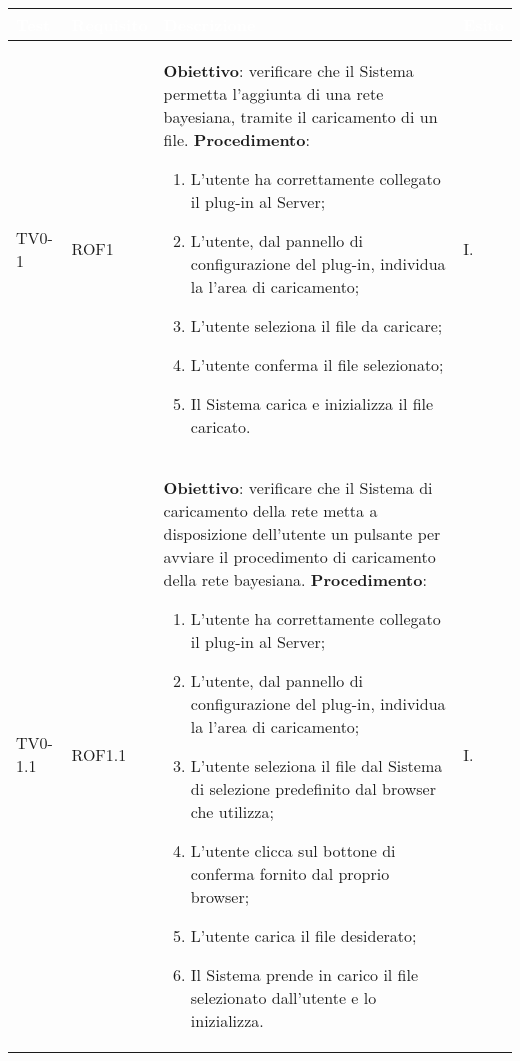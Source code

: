 \begin{longtable}{|C{.15\textwidth}|C{.13\textwidth}|m{.52\textwidth}|C{.08\textwidth}|}
\hline
{}\textbf{\textcolor{white}{Test}} & \textbf{\textcolor{white}{Requisito}} & \textbf{\textcolor{white}{Descrizione}} & \textbf{\textcolor{white}{Esito}}\\
\hline \hline
\endhead

TV0-1 & ROF1 &
	\textbf{Obiettivo}: verificare che il Sistema permetta l'aggiunta di una rete bayesiana, tramite il caricamento di un file. \newline
	\textbf{Procedimento}:
	\begin{enumerate}
		\item L'utente ha correttamente collegato il plug-in al Server;
		\item L'utente, dal pannello di configurazione del plug-in, individua la l'area di caricamento;
		\item L'utente seleziona il file da caricare;
		\item L'utente conferma il file selezionato;
		\item Il Sistema carica e inizializza il file caricato.
	\end{enumerate} & I. \\
\hline

 TV0-1.1 & ROF1.1 &
	\textbf{Obiettivo}: verificare che il Sistema di caricamento della rete metta a disposizione dell'utente un pulsante per avviare il procedimento di caricamento della rete bayesiana.
	\textbf{Procedimento}:
	\begin{enumerate}
		\item L'utente ha correttamente collegato il plug-in al Server;
		\item L'utente, dal pannello di configurazione del plug-in, individua la l'area di caricamento;
		\item L'utente seleziona il file dal Sistema di selezione predefinito dal browser che utilizza;
		\item L'utente clicca sul bottone di conferma fornito dal proprio browser;
		\item L'utente carica il file desiderato;
		\item Il Sistema prende in carico il file selezionato dall'utente e lo inizializza.
	\end{enumerate}
	& I. \\
\hline


\end{longtable}
